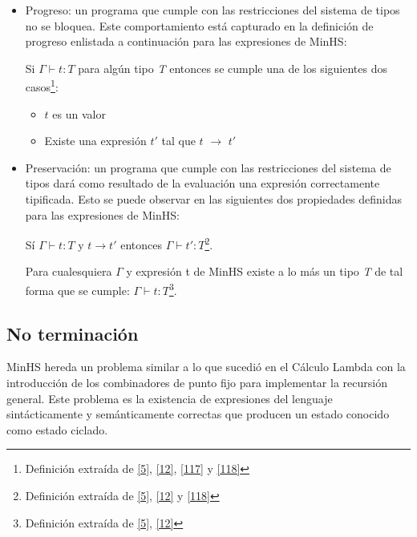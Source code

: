         \begin{itemize}
            \item Progreso: un programa que cumple con las restricciones del sistema de tipos no se bloquea. Este comportamiento está capturado en la definición de progreso enlistada a continuación para las expresiones de \textsf{MinHS}:
             
             \begin{definition}
                Si $\Gamma \vdash t : \textit{T}$ para algún tipo \textit{T} entonces se cumple una de los siguientes dos casos\footnote{Definición extraída de  \hyperlink{5}{[5]},  \hyperlink{12}{[12]}, \hyperlink{117}{[117]} y  \hyperlink{118}{[118]}}:
                \begin{itemize}
			\item $t$ es un valor 
                	\item Existe una expresión $t'$ tal que $t$ $\to$ $t'$
		   \end{itemize}
             \end{definition}

\bigskip
            \item Preservación: un programa que cumple con las restricciones del sistema de tipos dará como resultado de la evaluación una expresión correctamente tipificada. Esto se puede observar en las siguientes dos propiedades definidas para las expresiones de \textsf{MinHS}:
                                    
                     \begin{definition}
                        Sí $\Gamma \vdash t : \textit{T}$ y $t \to t'$ entonces $\Gamma \vdash t' : \textit{T}$\footnote{Definición extraída de  \hyperlink{5}{[5]},  \hyperlink{12}{[12]}  y \hyperlink{118}{[118]}}.
                    \end{definition}

                    \begin{definition}
                        Para cualesquiera $\Gamma$ y expresión t de \textsf{MinHS} existe a lo más un tipo \textit{T} de tal forma que se cumple: $\Gamma \vdash t : \textit{T}$\footnote{Definición extraída de \hyperlink{5}{[5]},  \hyperlink{12}{[12]}}.
                    \end{definition}

        \end{itemize}

    \subsection{No terminación}
        \textsf{MinHS} hereda un problema similar a lo que sucedió en el Cálculo Lambda con la introducción de los combinadores de punto fijo para implementar la recursión general. Este problema es la existencia de expresiones del lenguaje sintácticamente y semánticamente correctas que producen un estado conocido como estado ciclado.

